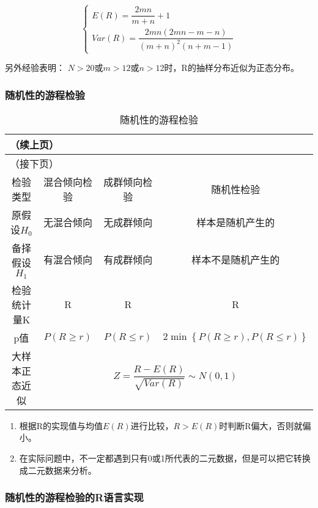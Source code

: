 \documentclass[UTF8]{ctexart}
\numberwithin{equation}{section}
\begin{document}
\begin{equation}
    \begin{cases}
        E(R) = \dfrac{2mn}{m+n} + 1 \\[1em]
        Var(R) = \dfrac{2mn(2mn-m-n)}{{(m+n)}^2 (n+m-1)}
    \end{cases}
    \nonumber
\end{equation}

另外经验表明：
$N>20$或$m>12$或$n>12$时，R的抽样分布近似为正态分布。

\subsubsection{随机性的游程检验}

\begin{center}
    \begin{longtable}{cccc}
        \caption{随机性的游程检验} \\ \toprule
        \endfirsthead
        \multicolumn{3}{l}{（续上页）} \\ \toprule
        \endhead
        \bottomrule
        \multicolumn{3}{l}{（接下页）} \\[2ex]
        \endfoot
        \bottomrule
        \endlastfoot
        检验类型 & 混合倾向检验 & 成群倾向检验 & 随机性检验 \\
        \hline
        原假设$H_0$ & 无混合倾向 & 无成群倾向 & 样本是随机产生的 \\
        备择假设$H_1$ & 有混合倾向 & 有成群倾向 & 样本不是随机产生的 \\
        检验统计量K & R & R & R \\
        p值 & $P(R \geq r)$ & $P(R \leq r)$ & $2 \min{\left\{ P(R \geq r), P(R \leq r) \right\}} $ \\
        大样本正态近似 & \multicolumn{3}{c}{$Z = \dfrac{R-E(R)}{\sqrt{Var(R)}} \sim N(0,1)$} \\
    \end{longtable}
\end{center}

\begin{enumerate}
    \item 根据R的实现值与均值$E(R)$进行比较，$R>E(R)$时判断R偏大，否则就偏小。
    \item 在实际问题中，不一定都遇到只有0或1所代表的二元数据，但是可以把它转换成二元数据来分析。
\end{enumerate}

\subsubsection{随机性的游程检验的R语言实现}
\end{document}
